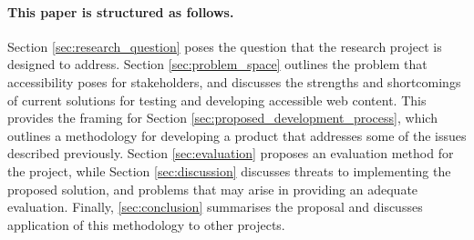 \paragraph{This paper is structured as follows.} %
\label{par:paragraph_name}
 Section \ref{sec:research_question} poses the question that the research project is designed to address. Section \ref{sec:problem_space} outlines the problem that accessibility poses for stakeholders, and discusses the strengths and shortcomings of current solutions for testing and developing accessible web content. This provides the framing for Section \ref{sec:proposed_development_process}, which outlines a methodology for developing a product that addresses some of the issues described previously. Section \ref{sec:evaluation} proposes an evaluation method for the project, while Section \ref{sec:discussion} discusses threats to implementing the proposed solution, and problems that may arise in providing an adequate evaluation. Finally, \ref{sec:conclusion} summarises the proposal and discusses application of this methodology to other projects.

